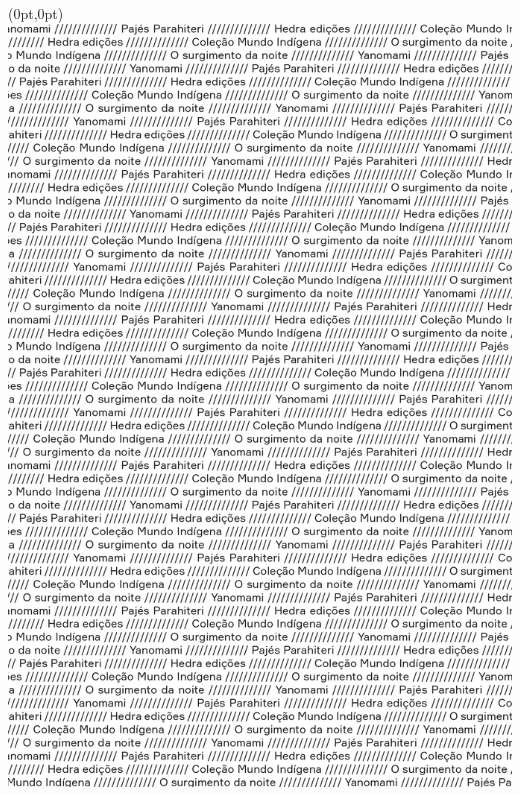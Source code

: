 

\thispagestyle{empty}

\begin{textblock*}{2.625in}(0pt,0pt)%
\vspace*{-2.5cm}
\hspace*{-2.65cm}\includegraphics[width=138mm]{./ABERTURA.png}  
\end{textblock*}


